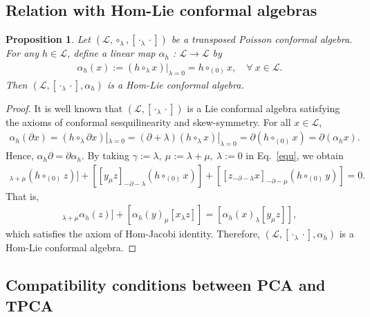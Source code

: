 \documentclass[11pt,letterpaper,reqno]{amsart}
\newtheorem{proposition}[theorem]{Proposition}
\theoremstyle{definition}
\numberwithin{equation}{section}
\begin{document}
\subsection{Relation with Hom-Lie conformal algebras}

\begin{proposition}
   Let $(\mathcal{L} ,\circ_\lambda,[\cdot_{\lambda}\cdot])$ be a transposed Poisson conformal algebra. For any $h\in \mathcal{L}$, define a linear map
   $\alpha_h$ : $\mathcal{L}  \rightarrow \mathcal{L}$ by
   \begin{align*}
      \alpha_h(x):=(h\circ_\lambda x)|_{\lambda=0}=h\circ_{(0)} x, \quad \forall ~x\in\mathcal{L}.
   \end{align*}
   Then $(\mathcal{L} ,[\cdot_{\lambda}\cdot],\alpha_h)$ is a Hom-Lie conformal algebra.
\end{proposition}

\begin{proof}
It is well known that $(\mathcal{L},[\cdot_{\lambda}\cdot])$ is a Lie conformal algebra satisfying the axioms of conformal sesquilinearity and skew-symmetry. For all $x\in\mathcal{L}$,
   \begin{align*}
      \alpha_h (\partial x)=(h\circ_\lambda \partial x)|_{\lambda=0}=(\partial+\lambda)(h\circ_\lambda x)|_{\lambda=0}=\partial(h\circ_{(0)} x)=\partial (\alpha_hx).
   \end{align*}
Hence, $\alpha_h\partial=\partial\alpha_h$. By taking $\gamma:=\lambda, ~\mu:=\lambda+\mu,~\lambda:=0$ in Eq.~\eqref{equ}, we obtain
   \begin{align*}
      [[x_{\lambda}y]_{\lambda+\mu}(h\circ_{(0)}z)]+[[y_{\mu}z]_{-\partial-\lambda}(h\circ_{(0)}x)]+[[z_{-\partial-\lambda}x]_{-\partial-\mu}(h\circ_{(0)}y)]=0.
   \end{align*}
That is,
   \begin{align*}
        [[x_{\lambda}y]_{\lambda+\mu}\alpha_h(z)]+[\alpha_h(y)_{\mu}[x_{\lambda}z]]=[\alpha_h(x)_{\lambda}[y_{\mu}z]],
   \end{align*}
which satisfies the axiom of Hom-Jacobi identity. Therefore, $(\mathcal{L} ,[\cdot_{\lambda}\cdot],\alpha_h)$ is a Hom-Lie conformal algebra.
\end{proof}

\subsection{Compatibility conditions between PCA and TPCA}
\end{document}
